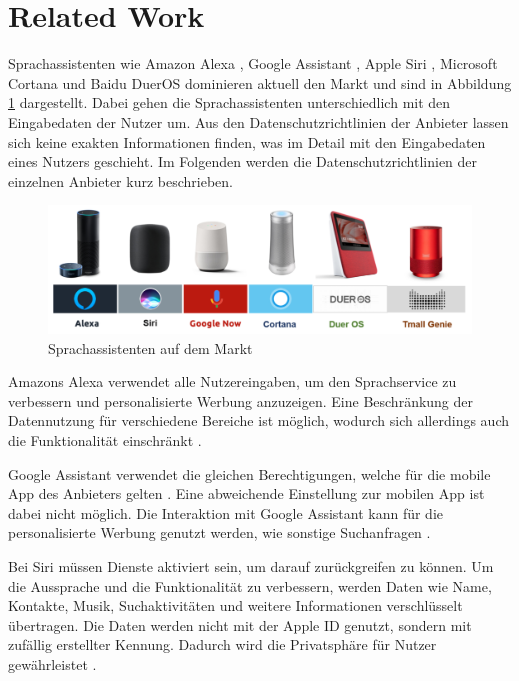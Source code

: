 \section{Related Work}
Sprachassistenten wie Amazon Alexa \cite{alexaAssitent}, Google Assistant \cite{googleAssistant}, Apple Siri \cite{siriAssistent}, Microsoft Cortana \cite{cortanaAssistent} und Baidu DuerOS \cite{baiduAssistant} dominieren aktuell den Markt und sind in Abbildung \ref{fig:sprachassistenten} dargestellt. Dabei gehen die Sprachassistenten unterschiedlich mit den Eingabedaten der Nutzer um. Aus den Datenschutzrichtlinien der Anbieter lassen sich keine exakten Informationen finden, was im Detail mit den Eingabedaten eines Nutzers geschieht. Im Folgenden werden die Datenschutzrichtlinien der einzelnen Anbieter kurz beschrieben.

\begin{figure}[h!]
	\centering
	\includegraphics[width=1\linewidth]{Picture/Sprachassistenten}
	\caption[Sprachassistenten auf dem Markt\cite{homeAssistants}]{Sprachassistenten auf dem Markt\cite{homeAssistants}}
	\label{fig:sprachassistenten}
\end{figure}

Amazons Alexa verwendet alle Nutzereingaben, um den Sprachservice zu verbessern und personalisierte Werbung anzuzeigen. Eine Beschränkung der Datennutzung für verschiedene Bereiche ist möglich, wodurch sich allerdings auch die Funktionalität einschränkt \cite{alexaPrivacy}.

Google Assistant verwendet die gleichen Berechtigungen, welche für die mobile App des Anbieters gelten \cite{googleShare}. Eine abweichende Einstellung zur mobilen App ist dabei nicht möglich. Die Interaktion mit Google Assistant kann für die personalisierte Werbung genutzt werden, wie sonstige Suchanfragen \cite{googlePrivacy}.

Bei Siri müssen Dienste aktiviert sein, um darauf zurückgreifen zu können. Um die Aussprache und die Funktionalität zu verbessern, werden Daten wie Name, Kontakte, Musik, Suchaktivitäten und weitere Informationen verschlüsselt übertragen. Die Daten werden nicht mit der Apple ID genutzt, sondern mit zufällig erstellter Kennung. Dadurch wird die Privatsphäre für Nutzer gewährleistet \cite{siriPrivacy}.

